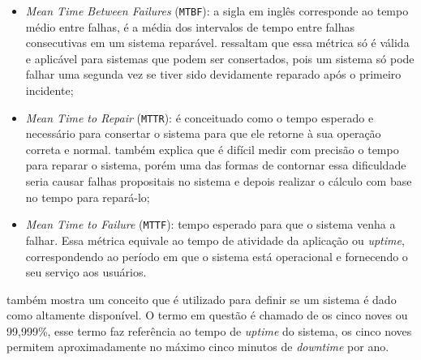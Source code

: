         \begin{itemize}
            \item \textit{Mean Time Between Failures} (\verb|MTBF|): a sigla em inglês corresponde ao tempo médio entre falhas, é a média dos intervalos de tempo entre falhas consecutivas em um sistema reparável.  ressaltam que essa métrica só é válida e aplicável para sistemas que podem ser consertados, pois um sistema só pode falhar uma segunda vez se tiver sido devidamente reparado após o primeiro incidente;
            
            \item \textit{Mean Time to Repair} (\verb|MTTR|): é conceituado como o tempo esperado e necessário para consertar o sistema para que ele retorne à sua operação correta e normal.  também explica que é difícil medir com precisão o tempo para reparar o sistema, porém uma das formas de contornar essa dificuldade seria causar falhas propositais no sistema e depois realizar o cálculo com base no tempo para repará-lo;
            
            \item \textit{Mean Time to Failure} (\verb|MTTF|): tempo esperado para que o sistema venha a falhar. Essa métrica equivale ao tempo de atividade da aplicação ou \textit{uptime}, correspondendo ao período em que o sistema está operacional e fornecendo o seu serviço aos usuários.
        \end{itemize}

         também mostra um conceito que é utilizado para definir se um sistema é dado como altamente disponível. O termo em questão é chamado de os cinco noves ou 99,999\%, esse termo faz referência ao tempo de \textit{uptime} do sistema, os cinco noves permitem aproximadamente no máximo cinco minutos de \textit{downtime} por ano.

